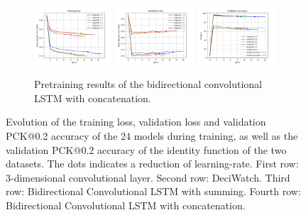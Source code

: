 \documentclass[./main.tex]{subfiles}
\begin{document}
\begin{figure}[htbp]
    \begin{subfigure}[b]{\textwidth}
        \centering
        \includegraphics[width=0.32\textwidth]{./entities/pretrained/unipose2/train_losses.png}
        \includegraphics[width=0.32\textwidth]{./entities/pretrained/unipose2/val_losses.png}
        \includegraphics[width=0.32\textwidth]{./entities/pretrained/unipose2/val_accs.png}
        \caption{Pretraining results of the bidirectional convolutional LSTM with concatenation.}
    \end{subfigure}
    \hfill
    
    \caption{Evolution of the training loss, validation loss and validation PCK@0.2 accuracy of the 24 models during training, as well as the validation PCK@0.2 accuracy of the identity function of the two datasets. The dots indicates a reduction of learning-rate. First row: 3-dimensional convolutional layer. Second row: DeciWatch. Third row: Bidirectional Convolutional LSTM with summing. Fourth row: Bidirectional Convolutional LSTM with concatenation.}
    \label{fig:pretrainin_res}
\end{figure}
\end{document}
